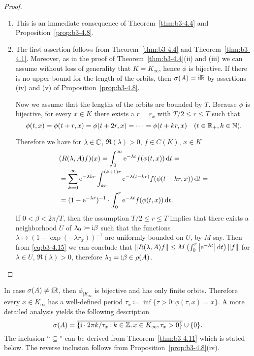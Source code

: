 \begin{proof}
\begin{enumerate}[\upshape (i), wide, labelindent=.5em]%
\item 
	This is an immediate consequence of Theorem~\ref{thm:b3-4.4} and Proposition~\ref{prop:b3-4.8}.
	
\item 
	The first assertion follows from Theorem~\ref{thm:b3-4.4} and Theorem~\ref{thm:b3-4.1}.
	Moreover, as in the proof of Theorem~\ref{thm:b3-4.4}(ii) and (iii) we can assume without loss of generality that $K = K_{\infty}$, hence $\phi$ is bijective.
	If there is no upper bound for the length of the orbits, then $\sigma(A) = \mathrm{i}\mathbb{R}$ by assertions (iv) and (v) of Proposition~\ref{prop:b3-4.8}.
	
	Now we assume that the lengths of the orbits are bounded by $T$.
	Because $\phi$ is bijective, for every $x \in K$ there exists a $r = r_{x}$ with $T/2 \leq r \leq T$ such that 
	\[
	\phi(t,x) = \phi(t+r,x) = \phi(t+2r,x) = \cdots = \phi(t+kr,x) \quad (t \in \mathbb{R}_{+}, k \in \mathbb{N}).
	\]
	
	Therefore we have for $\lambda \in \mathbb{C}$, $\Re(\lambda) > 0$, $f \in C(K)$, $x \in K$
	\begin{equation}\label{eq:b3-4.15}
		\begin{aligned}
			&(R(\lambda,A)f)(x) = \int_{0}^{\infty} \mathrm{e}^{-\lambda t}f(\phi(t,x)) \mathop{}\!\mathrm{d}{t} = \\
			&= \sum_{k=0}^{\infty} \mathrm{e}^{-\lambda kr}\int_{kr}^{(k+1)r} \mathrm{e}^{-\lambda(t-kr)} f(\phi(t-kr,x)) \mathop{}\!\mathrm{d}{t} =  \\
			&= (1 - \mathrm{e}^{-\lambda r})^{-1}\cdot\int_{0}^{r} \mathrm{e}^{-\lambda t} f(\phi(t,x)) \mathop{}\!\mathrm{d}{t}.
		\end{aligned}
	\end{equation}
	If $0 < \beta < 2\pi/T$, then the assumption $T/2 \leq r \leq T$ implies that there exists a neighborhood $U$ of $\lambda_{0} \coloneq \mathrm{i}\beta$ such that the functions $\lambda \mapsto (1 - \exp(-\lambda r_{x}))^{-1}$ are uniformly bounded on $U$, by $M$ say.
    Then from \eqref{eq:b3-4.15} we can conclude that $\|R(\lambda,A)f\| \leq M\left(\int_{0}^{r} \left|\mathrm{e}^{-\lambda t}\right|\mathop{}\!\mathrm{d}{t}\right)\|f\|$ for $\lambda \in U$, $\Re(\lambda) > 0$, therefore $\lambda_{0} = \mathrm{i}\beta \in \rho(A)$.
\end{enumerate}
\end{proof}
\begin{remark}\label{rem:b3-4.10}
	In case $\sigma(A) \neq \mathrm{i}\mathbb{R}$, then $\phi_{|K_{\infty}}$ is bijective and has only finite orbits.
	Therefore every $x \in K_{\infty}$ has a well-defined period $\tau_{x} \coloneq \inf\{\tau > 0 \colon \phi(\tau,x) = x\}$.
	A more detailed analysis yields the following description 
	\begin{equation}\label{eq:b3-4.16}
		\sigma(A) = \overline{\{\mathrm{i} \cdot 2\pi k/\tau_{x} \colon k \in \mathbb{Z}, x \in K_{\infty}, \tau_{x} > 0\}} \cup \{0\}.
	\end{equation}
	The inclusion \enquote{$\subseteq$} can be derived from Theorem~\ref{thm:b3-4.11} which is stated below.
	The reverse inclusion follows from Proposition~\ref{prop:b3-4.8}(iv).
\end{remark}
